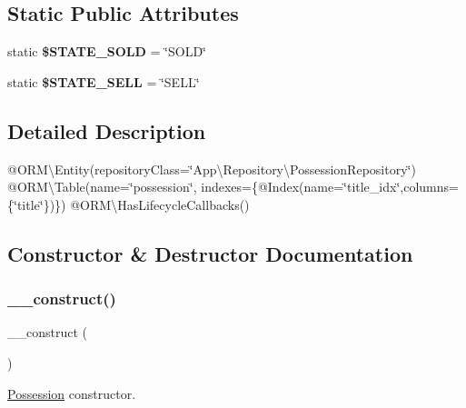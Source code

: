 \subsection*{Static Public Attributes}
\begin{DoxyCompactItemize}
\item 
\mbox{\label{class_app_1_1_entity_1_1_possession_acbbc1bd82fe79f9cf752693e9d0f1342}} 
static {\bfseries \$\+S\+T\+A\+T\+E\+\_\+\+S\+O\+LD} = \char`\"{}S\+O\+LD\char`\"{}
\item 
\mbox{\label{class_app_1_1_entity_1_1_possession_abc87cf338ce8fb1d39121d0024cde329}} 
static {\bfseries \$\+S\+T\+A\+T\+E\+\_\+\+S\+E\+LL} = \char`\"{}S\+E\+LL\char`\"{}
\end{DoxyCompactItemize}


\subsection{Detailed Description}
@\+O\+RM\textbackslash{}\+Entity(repository\+Class=\char`\"{}\+App\textbackslash{}\+Repository\textbackslash{}\+Possession\+Repository\char`\"{}) @\+O\+RM\textbackslash{}\+Table(name=\char`\"{}possession\char`\"{}, indexes=\{@\+Index(name=\char`\"{}title\+\_\+idx\char`\"{},columns=\{\char`\"{}title\char`\"{}\})\}) @\+O\+RM\textbackslash{}\+Has\+Lifecycle\+Callbacks() 

\subsection{Constructor \& Destructor Documentation}
\mbox{\label{class_app_1_1_entity_1_1_possession_a095c5d389db211932136b53f25f39685}} 
\subsubsection{\texorpdfstring{\_\_construct()}{\_\_construct()}}
{\footnotesize\ttfamily \+\_\+\+\_\+construct (\begin{DoxyParamCaption}{ }\end{DoxyParamCaption})}

\mbox{\hyperlink{class_app_1_1_entity_1_1_possession}{Possession}} constructor. 

